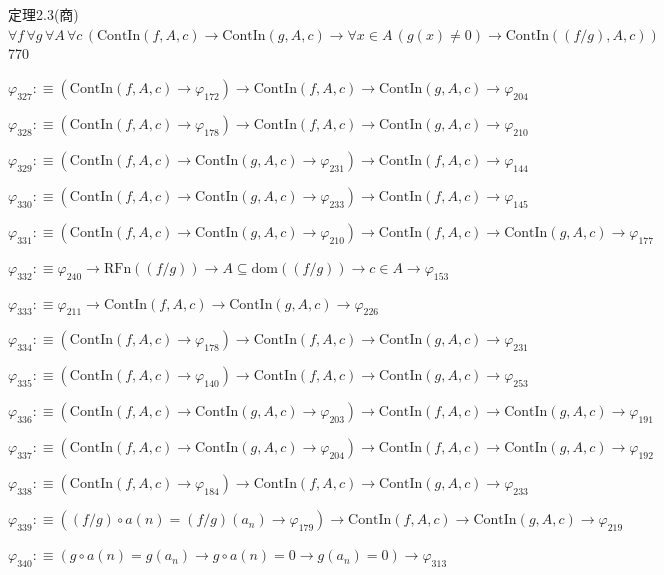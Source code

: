 \begin{fullproof}{定理2.3(商)}{$\forall f\,\forall g\,\forall A\,\forall c\,(\mathrm{ContIn}(f,A,c) \to \mathrm{ContIn}(g,A,c) \to \forall x \in A\,(g(x) \neq 0) \to \mathrm{ContIn}((f / g),A,c))$}{770}
\begin{abbrevlist}
\item $\varphi_{327} :\equiv (\mathrm{ContIn}(f,A,c) \to \varphi_{172}) \to \mathrm{ContIn}(f,A,c) \to \mathrm{ContIn}(g,A,c) \to \varphi_{204}$
\item $\varphi_{328} :\equiv (\mathrm{ContIn}(f,A,c) \to \varphi_{178}) \to \mathrm{ContIn}(f,A,c) \to \mathrm{ContIn}(g,A,c) \to \varphi_{210}$
\item $\varphi_{329} :\equiv (\mathrm{ContIn}(f,A,c) \to \mathrm{ContIn}(g,A,c) \to \varphi_{231}) \to \mathrm{ContIn}(f,A,c) \to \varphi_{144}$
\item $\varphi_{330} :\equiv (\mathrm{ContIn}(f,A,c) \to \mathrm{ContIn}(g,A,c) \to \varphi_{233}) \to \mathrm{ContIn}(f,A,c) \to \varphi_{145}$
\item $\varphi_{331} :\equiv (\mathrm{ContIn}(f,A,c) \to \mathrm{ContIn}(g,A,c) \to \varphi_{210}) \to \mathrm{ContIn}(f,A,c) \to \mathrm{ContIn}(g,A,c) \to \varphi_{177}$
\item $\varphi_{332} :\equiv \varphi_{240} \to \mathrm{RFn}((f / g)) \to A \subseteq \mathrm{dom}((f / g)) \to c \in A \to \varphi_{153}$
\item $\varphi_{333} :\equiv \varphi_{211} \to \mathrm{ContIn}(f,A,c) \to \mathrm{ContIn}(g,A,c) \to \varphi_{226}$
\item $\varphi_{334} :\equiv (\mathrm{ContIn}(f,A,c) \to \varphi_{178}) \to \mathrm{ContIn}(f,A,c) \to \mathrm{ContIn}(g,A,c) \to \varphi_{231}$
\item $\varphi_{335} :\equiv (\mathrm{ContIn}(f,A,c) \to \varphi_{140}) \to \mathrm{ContIn}(f,A,c) \to \mathrm{ContIn}(g,A,c) \to \varphi_{253}$
\item $\varphi_{336} :\equiv (\mathrm{ContIn}(f,A,c) \to \mathrm{ContIn}(g,A,c) \to \varphi_{203}) \to \mathrm{ContIn}(f,A,c) \to \mathrm{ContIn}(g,A,c) \to \varphi_{191}$
\item $\varphi_{337} :\equiv (\mathrm{ContIn}(f,A,c) \to \mathrm{ContIn}(g,A,c) \to \varphi_{204}) \to \mathrm{ContIn}(f,A,c) \to \mathrm{ContIn}(g,A,c) \to \varphi_{192}$
\item $\varphi_{338} :\equiv (\mathrm{ContIn}(f,A,c) \to \varphi_{184}) \to \mathrm{ContIn}(f,A,c) \to \mathrm{ContIn}(g,A,c) \to \varphi_{233}$
\item $\varphi_{339} :\equiv ((f / g) \circ a(n) = (f / g)(a_{n}) \to \varphi_{179}) \to \mathrm{ContIn}(f,A,c) \to \mathrm{ContIn}(g,A,c) \to \varphi_{219}$
\item $\varphi_{340} :\equiv (g \circ a(n) = g(a_{n}) \to g \circ a(n) = 0 \to g(a_{n}) = 0) \to \varphi_{313}$

\end{abbrevlist}
\end{fullproof}
